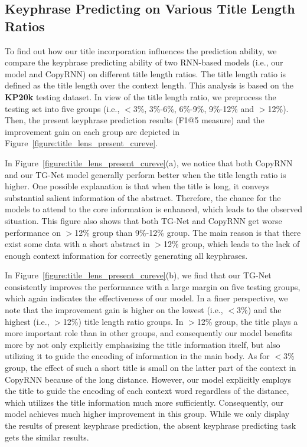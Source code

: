 \documentclass[letterpaper]{article} %
\begin{document}
\subsection{Keyphrase Predicting on Various Title Length Ratios}
To find out how our title incorporation influences the prediction ability, we compare the keyphrase predicting ability of two RNN-based models (i.e., our model and CopyRNN) on different title length ratios. The title length ratio is defined as the title length over the context length. This analysis is based on the \textbf{KP20k} testing dataset. In view of the title length ratio, we preprocess the testing set into five groups (i.e., $<$3\%, 3\%-6\%, 6\%-9\%, 9\%-12\% and $>$12\%). Then, the present keyphrase prediction results (F1@5 measure) and the improvement gain on each group are depicted in Figure~\ref{figure:title_lens_present_cureve}.


In Figure~\ref{figure:title_lens_present_cureve}(a), we notice that both CopyRNN and our TG-Net model generally perform better when the title length ratio is higher. One possible explanation is that when the title is long, it conveys substantial salient information of the abstract. Therefore, the chance for the models to attend to the core information is enhanced, which leads to the observed situation. This figure also shows that both TG-Net and CopyRNN get worse performance on $>$12\% group than 9\%-12\% group. The main reason is that there exist some data with a short abstract in $>$12\% group, which leads to the lack of enough context information for correctly generating all keyphrases.


In Figure~\ref{figure:title_lens_present_cureve}(b), we find that our TG-Net consistently improves the performance with a large margin on five testing groups, which again indicates the effectiveness of our model. In a finer perspective, we note that the improvement gain is higher on the lowest (i.e., $<$3\%) and the highest (i.e., $>$12\%) title length ratio groups. In $>$12\% group, the title plays a more important role than in other groups, and consequently our model benefits more by not only explicitly emphasizing the title information itself, but also utilizing it to guide the encoding of information in the main body. As for $<$3\% group, the effect of such a short title is small on the latter part of the context in CopyRNN because of the long distance. However, our model explicitly employs the title to guide the encoding of each context word regardless of the distance, which utilizes the title information much more sufficiently. Consequently, our model achieves much higher improvement in this group. While we only display the results of present keyphrase prediction, the absent keyphrase predicting task gets the similar results.
\end{document}
